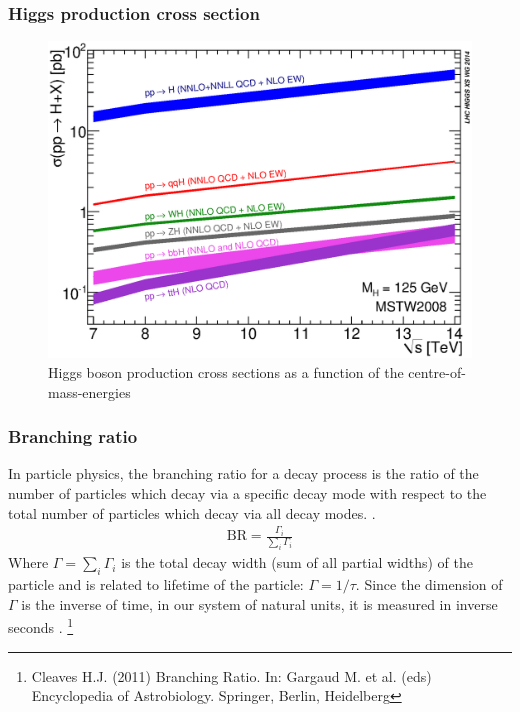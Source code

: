 \documentclass[11pt]{beamer}
\begin{document}
\begin{frame}
\frametitle{Higgs production cross section}
\begin{center}
\begin{figure}
\includegraphics[scale=0.42]{figures/7-14xsec.eps}
\caption{ Higgs boson production cross sections as a function of the centre-of-mass-energies}	
\end{figure}
\end{center}
\end{frame}



\begin{frame}
\frametitle{Branching ratio}
\small{In particle physics, the branching ratio for a decay process is the ratio of the number of particles which decay via a specific decay mode with respect to the total number of particles which decay via all decay modes. \footnotemark.}
\begin{align}
\text{BR} =\frac{\Gamma_i}{\sum_{i}\Gamma_i}
\end{align}
\small{Where $\Gamma=\sum_i\Gamma_i$ is the total decay width (sum of all partial widths) of the particle and is related to lifetime of the particle: $\Gamma=1/\tau$.
Since the dimension of $\Gamma$ is the inverse of time, in our system of natural units, it is measured in inverse seconds} .%
\footnote[0]{\tiny{Cleaves H.J. (2011) Branching Ratio. In: Gargaud M. et al. (eds) Encyclopedia of Astrobiology. Springer, Berlin, Heidelberg} }
\end{frame}
 
\end{document}
